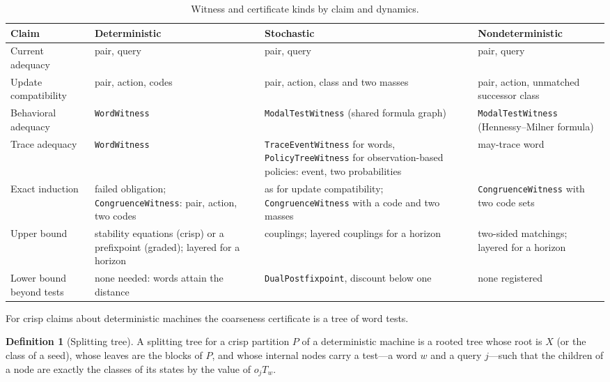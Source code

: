 \documentclass[11pt]{article}
\newcommand{\code}[1]{\texttt{#1}}
\theoremstyle{definition}
\newtheorem{definition}{Definition}[section]
\theoremstyle{plain}
\begin{document}
\begin{table}[ht]
\centering\small
\begin{tabularx}{\textwidth}{>{\raggedright\arraybackslash}p{3.0cm}>{\raggedright\arraybackslash}X>{\raggedright\arraybackslash}X>{\raggedright\arraybackslash}X}
\toprule
Claim & Deterministic & Stochastic & Nondeterministic\\
\midrule
Current adequacy & pair, query & pair, query & pair, query\\
Update compatibility & pair, action, codes & pair, action, class and two masses & pair, action, unmatched successor class\\
Behavioral adequacy & \code{WordWitness} & \code{ModalTestWitness} (shared formula graph) & \code{ModalTestWitness} (Hennessy--Milner formula)\\
Trace adequacy & \code{WordWitness} & \code{TraceEventWitness} for words, \code{PolicyTreeWitness} for observation-based policies: event, two probabilities & may-trace word\\
Exact induction & failed obligation; \code{CongruenceWitness}: pair, action, two codes & as for update compatibility; \code{CongruenceWitness} with a code and two masses & \code{CongruenceWitness} with two code sets\\
Upper bound & stability equations (crisp) or a prefixpoint (graded); layered for a horizon & couplings; layered couplings for a horizon & two-sided matchings; layered for a horizon\\
Lower bound beyond tests & none needed: words attain the distance & \code{DualPostfixpoint}, discount below one & none registered\\
\bottomrule
\end{tabularx}
\caption{Witness and certificate kinds by claim and dynamics.}\label{tab:witnesses}
\end{table}

For crisp claims about deterministic machines the coarseness certificate is a tree of word tests.

\begin{definition}[Splitting tree]\label{def:splittingtree}
A splitting tree for a crisp partition $P$ of a deterministic machine is a rooted tree whose root
is $X$ (or the class of a seed), whose leaves are the blocks of $P$, and whose internal nodes carry
a test---a word $w$ and a query $j$---such that the children of a node are exactly the classes of
its states by the value of $o_jT_w$.
\end{definition}
\end{document}
